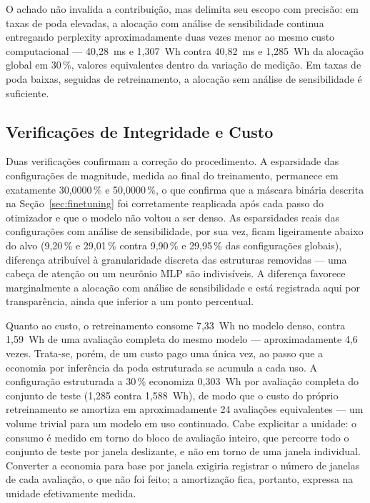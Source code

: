 O achado não invalida a contribuição, mas delimita seu escopo com precisão: em
taxas de poda elevadas, a alocação com análise de sensibilidade continua entregando
perplexity aproximadamente duas vezes menor ao mesmo custo computacional
--- 40,28~ms e 1,307~Wh contra 40,82~ms e 1,285~Wh da alocação global em
30\,\%, valores equivalentes dentro da variação de medição. Em taxas de poda
baixas, seguidas de retreinamento, a alocação sem análise de sensibilidade é suficiente.

\subsection{Verificações de Integridade e Custo}\label{subsec:ft_verificacoes}

Duas verificações confirmam a correção do procedimento. A esparsidade das
configurações de magnitude, medida ao final do treinamento, permanece em
exatamente 30,0000\,\% e 50,0000\,\%, o que confirma que a máscara binária
descrita na Seção~\ref{sec:finetuning} foi corretamente reaplicada após cada
passo do otimizador e que o modelo não voltou a ser denso. As esparsidades
reais das configurações com análise de sensibilidade, por sua vez, ficam
ligeiramente abaixo do alvo (9,20\,\% e 29,01\,\% contra 9,90\,\% e 29,95\,\%
das configurações globais), diferença atribuível à granularidade discreta das
estruturas removidas --- uma cabeça de atenção ou um neurônio MLP são
indivisíveis. A diferença favorece marginalmente a alocação com análise de
sensibilidade e está registrada aqui por transparência, ainda que inferior a um ponto
percentual.

Quanto ao custo, o retreinamento consome 7,33~Wh no modelo denso, contra
1,59~Wh de uma avaliação completa do mesmo modelo --- aproximadamente 4,6
vezes. Trata-se, porém, de um custo pago uma única vez, ao passo que a
economia por inferência da poda estruturada se acumula a cada uso. A
configuração estruturada a 30\,\% economiza 0,303~Wh por avaliação completa
do conjunto de teste (1,285 contra 1,588~Wh), de modo que o custo do próprio
retreinamento se amortiza em aproximadamente 24 avaliações equivalentes --- um
volume trivial para um modelo em uso continuado. Cabe explicitar a unidade:
o consumo é medido em torno do bloco de avaliação inteiro, que percorre todo o
conjunto de teste por janela deslizante, e não em torno de uma janela
individual. Converter a economia para base por janela exigiria registrar o
número de janelas de cada avaliação, o que não foi feito; a amortização fica,
portanto, expressa na unidade efetivamente medida.

